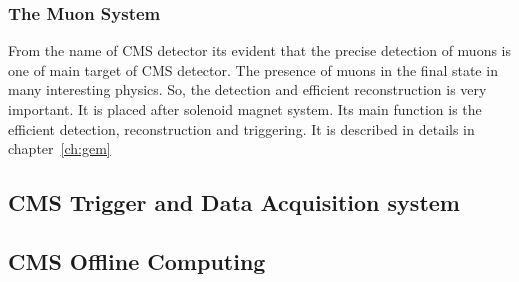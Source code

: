 \subsubsection{The Muon System} %
\label{sub:the_muon_system}
From the name of CMS detector its evident that the precise detection of muons is one of main target of CMS detector. The presence of muons in the final state in many interesting physics. So, the detection and efficient reconstruction is very important. It is placed after solenoid magnet system. Its main function is the efficient detection, reconstruction and triggering.
It is described in details in chapter~\ref{ch:gem}



\subsection{CMS Trigger and Data Acquisition system} %
\label{sub:cms_trigger_and_data_acquisition_system}


\subsection{CMS Offline Computing} %
\label{sub:cms_offline_computing}














